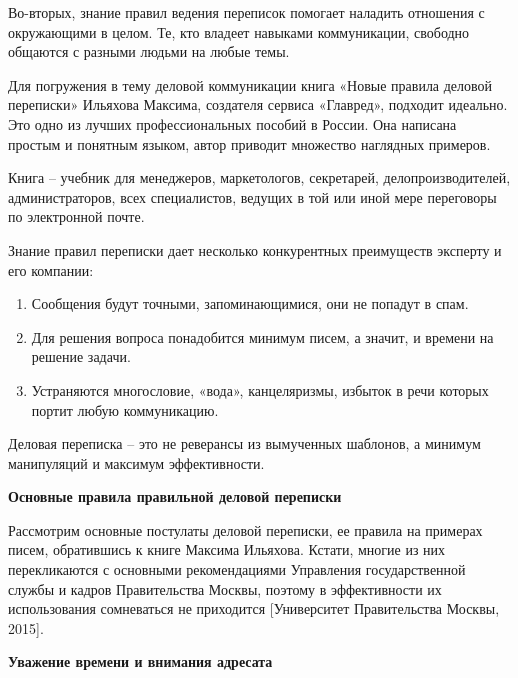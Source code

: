 Во-вторых, знание правил ведения переписок помогает наладить отношения с окружающими в целом. Те, кто владеет навыками коммуникации, свободно общаются с разными людьми на любые темы.

Для погружения в тему деловой коммуникации книга «Новые правила деловой переписки» Ильяхова Максима, создателя сервиса «Главред», подходит идеально. Это одно из лучших профессиональных пособий в России. Она написана простым и понятным языком, автор приводит множество наглядных примеров.

Книга – учебник для менеджеров, маркетологов, секретарей, делопроизводителей, администраторов, всех специалистов, ведущих в той или иной мере переговоры по электронной почте.

Знание правил переписки дает несколько конкурентных преимуществ эксперту и его компании:
\begin{enumerate}
    \item Сообщения будут точными, запоминающимися, они не попадут в спам.
    \item Для решения вопроса понадобится минимум писем, а значит, и времени на решение задачи.
    \item Устраняются многословие, «вода», канцеляризмы, избыток в речи которых портит любую коммуникацию.
\end{enumerate}

Деловая переписка – это не реверансы из вымученных шаблонов, а минимум манипуляций и максимум эффективности.

\textbf{Основные правила правильной деловой переписки}

Рассмотрим основные постулаты деловой переписки, ее правила на примерах писем, обратившись к книге Максима Ильяхова. Кстати, многие из них перекликаются с основными рекомендациями Управления государственной службы и кадров Правительства Москвы, поэтому в эффективности их использования сомневаться не приходится [Университет Правительства Москвы, 2015].

\textbf{Уважение времени и внимания адресата}


